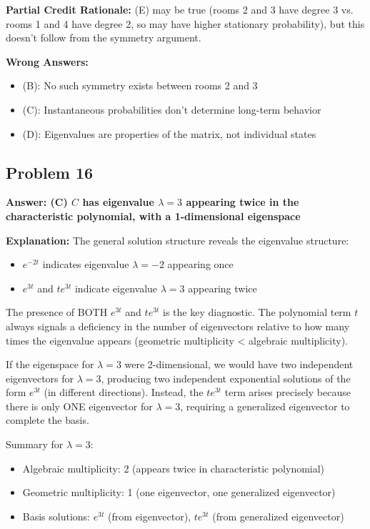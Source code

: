 \documentclass[12pt]{amsart}
\newcommand{\correct}[1]{{\color{correctgreen}\textbf{#1}}}
\begin{document}
\textbf{Partial Credit Rationale:} (E) may be true (rooms 2 and 3 have degree 3 vs. rooms 1 and 4 have degree 2, so may have higher stationary probability), but this doesn't follow from the symmetry argument.

\textbf{Wrong Answers:}
\begin{itemize}
\item (B): No such symmetry exists between rooms 2 and 3
\item (C): Instantaneous probabilities don't determine long-term behavior
\item (D): Eigenvalues are properties of the matrix, not individual states
\end{itemize}

\subsection*{Problem 16}
\correct{Answer: (C) $C$ has eigenvalue $\lambda = 3$ appearing twice in the characteristic polynomial, with a 1-dimensional eigenspace}

\textbf{Explanation:} The general solution structure reveals the eigenvalue structure:
\begin{itemize}
\item $e^{-2t}$ indicates eigenvalue $\lambda = -2$ appearing once
\item $e^{3t}$ and $te^{3t}$ indicate eigenvalue $\lambda = 3$ appearing twice
\end{itemize}

The presence of BOTH $e^{3t}$ and $te^{3t}$ is the key diagnostic. The polynomial term $t$ always signals a deficiency in the number of eigenvectors relative to how many times the eigenvalue appears (geometric multiplicity < algebraic multiplicity).

If the eigenspace for $\lambda = 3$ were 2-dimensional, we would have two independent eigenvectors for $\lambda = 3$, producing two independent exponential solutions of the form $e^{3t}$ (in different directions). Instead, the $te^{3t}$ term arises precisely because there is only ONE eigenvector for $\lambda = 3$, requiring a generalized eigenvector to complete the basis.

Summary for $\lambda = 3$:
\begin{itemize}
\item Algebraic multiplicity: 2 (appears twice in characteristic polynomial)
\item Geometric multiplicity: 1 (one eigenvector, one generalized eigenvector)
\item Basis solutions: $e^{3t}$ (from eigenvector), $te^{3t}$ (from generalized eigenvector)
\end{itemize}
\end{document}
